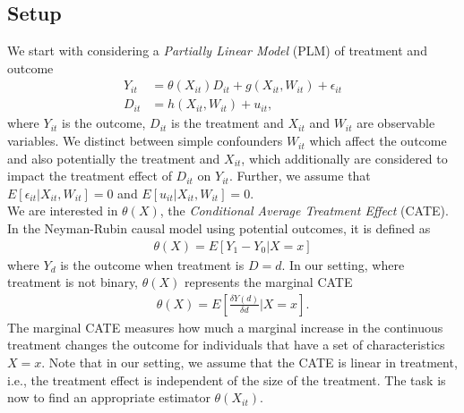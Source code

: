 \subsection{Setup} \label{sec:dml-idea}
We start with considering a \textit{Partially Linear Model} (PLM) of treatment and outcome 
\begin{align}
    Y_{it}&=\theta(X_{it})D_{it}+g(X_{it}, W_{it})+\epsilon_{it} \label{eq:plm1}\\
    D_{it}&=h(X_{it}, W_{it})+u_{it}, \label{eq:plm2}
\end{align}
where $Y_{it}$ is the outcome, $D_{it}$ is the treatment and $X_{it}$ and $W_{it}$ are observable variables. We distinct between simple confounders $W_{it}$ which affect the outcome and also potentially the treatment and $X_{it}$, which additionally are considered to impact the treatment effect of $D_{it}$ on $Y_{it}$. Further, we assume that $E[\epsilon_{it}|X_{it}, W_{it}]=0$ and $E[u_{it}|X_{it}, W_{it}]=0$. \\ 
We are interested in $\theta(X)$, the \textit{Conditional Average Treatment Effect} (CATE). In the Neyman-Rubin causal model using potential outcomes, it is defined as
\begin{align*}
    \theta(X)=E[Y_1 - Y_0 | X=x]
\end{align*}
where $Y_d$ is the outcome when treatment is $D=d$. In our setting, where treatment is not binary, $\theta(X)$ represents the marginal CATE
\begin{align*}
    \theta(X)=E\left[\frac{\delta Y(d)}{\delta d} \bigg| X=x\right].
\end{align*}
The marginal CATE measures how much a marginal increase in the continuous treatment changes the outcome for individuals that have a set of characteristics $X=x$. Note that in our setting, we assume that the CATE is linear in treatment, i.e., the treatment effect is independent of the size of the treatment. The task is now to find an appropriate estimator ${\theta}(X_{it})$.

